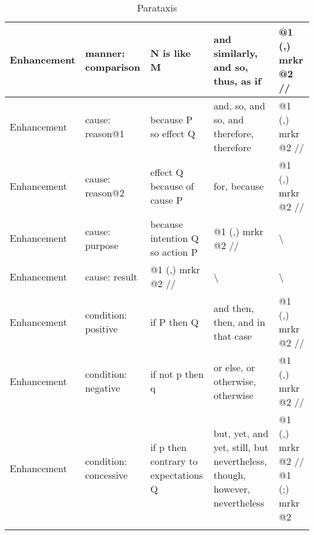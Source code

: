 \begin{landscape}
\begin{longtable}{|l|l|l|l|l|}
			Enhancement & manner: comparison     & N is like M                          & and similarly, and so, thus, as if                                                     & @1 (,) mrkr @2 //                                                                       \\ \hline
			Enhancement & cause: reason@1        & because P so effect Q                & and, so, and so, and therefore, therefore                                              & @1 (,) mrkr @2 //                                                                       \\ \hline
			Enhancement & cause: reason@2        & effect Q because of cause P          & for, because                                                                           & @1 (,) mrkr @2 //                                                                       \\ \hline
			Enhancement & cause: purpose         & because intention Q so action P      & @1 (,) mrkr @2 //                                                                      & \textbackslash                                                                          \\ \hline
			Enhancement & cause: result          & @1 (,) mrkr @2 //                    & \textbackslash                                                                         & \textbackslash                                                                          \\ \hline
			Enhancement & condition: positive    & if P then Q                          & and then, then, and in that case                                                       & @1 (,) mrkr @2 //                                                                       \\ \hline
			Enhancement & condition: negative    & if not p then q                      & or else, or otherwise, otherwise                                                       & @1 (,) mrkr @2 //                                                                       \\ \hline
			Enhancement & condition: concessive  & if p then contrary to expectations Q & but, yet, and yet, still, but nevertheless, though, however, nevertheless              & @1 (,) mrkr @2 // @1 (;) mrkr @2                                                        \\ \hline
			
			\caption{Parataxis}
			\label{tab:parataxis}
		\end{longtable}


\end{landscape}
